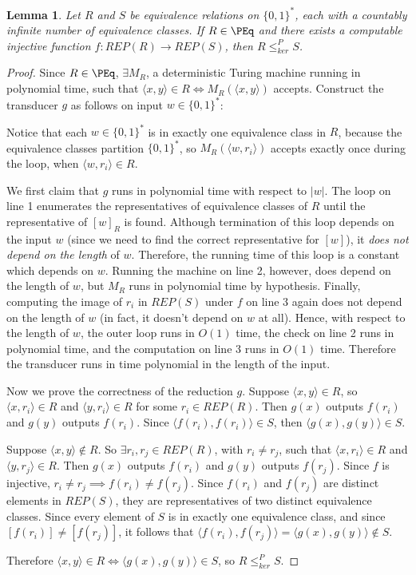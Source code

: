 \documentclass{article}
\newtheorem{lemma}[lemma]{Lemma}
\theoremstyle{definition} \newtheorem{definition}[definition]{Definition}
\newcommand{\sigmastar}{\{0, 1\}^{*}} %
\newcommand{\kr}{\leq^{P}_{ker}} %
\newcommand{\pair}[2]{\langle#1,#2\rangle} %
\begin{document}
\begin{lemma}\label{lem:repr_kr}
  Let $R$ and $S$ be equivalence relations on $\sigmastar$, each with a countably infinite number of equivalence classes.
  If $R\in\PEq$ and there exists a computable injective function $f\colon REP(R)\to REP(S)$, then $R\kr S$.
\end{lemma}
\begin{proof}
  Since $R\in\PEq$, $\exists M_R$, a deterministic Turing machine running in polynomial time, such that $\pair{x}{y}\in R\iff M_R(\pair{x}{y})$ accepts.
  Construct the transducer $g$ as follows on input $w\in\sigmastar$:\\
  \begin{algorithm}[H]
    \For{$r_i\in REP(R)$}{
      \If{$M_R(\pair{w}{r_i})$ accepts}{
        \Return{$f(r_i)$}
      }
    }
  \end{algorithm}
  Notice that each $w\in\sigmastar$ is in exactly one equivalence class in $R$, because the equivalence classes partition $\sigmastar$, so $M_R(\pair{w}{r_i})$ accepts exactly once during the loop, when $\pair{w}{r_i}\in R$.

  We first claim that $g$ runs in polynomial time with respect to $|w|$.
  The loop on line 1 enumerates the representatives of equivalence classes of $R$ until the representative of $[w]_R$ is found.
  Although termination of this loop depends on the input $w$ (since we need to find the correct representative for $[w]$), it \emph{does not depend on the length} of $w$.
  Therefore, the running time of this loop is a constant which depends on $w$.
  Running the machine on line 2, however, does depend on the length of $w$, but $M_R$ runs in polynomial time by hypothesis.
  Finally, computing the image of $r_i$ in $REP(S)$ under $f$ on line 3 again does not depend on the length of $w$ (in fact, it doesn't depend on $w$ at all).
  Hence, with respect to the length of $w$, the outer loop runs in $O(1)$ time, the check on line 2 runs in polynomial time, and the computation on line 3 runs in $O(1)$ time.
  Therefore the transducer runs in time polynomial in the length of the input.

  Now we prove the correctness of the reduction $g$.
  Suppose $\pair{x}{y}\in R$, so $\pair{x}{r_i}\in R$ and $\pair{y}{r_i}\in R$ for some $r_i\in REP(R)$.
  Then $g(x)$ outputs $f(r_i)$ and $g(y)$ outputs $f(r_i)$.
  Since $\pair{f(r_i)}{f(r_i)}\in S$, then $\pair{g(x)}{g(y)}\in S$.

  Suppose $\pair{x}{y}\notin R$.
  So $\exists r_i, r_j\in REP(R)$, with $r_i\neq r_j$, such that $\pair{x}{r_i}\in R$ and $\pair{y}{r_j}\in R$.
  Then $g(x)$ outputs $f(r_i)$ and $g(y)$ outputs $f(r_j)$.
  Since $f$ is injective, $r_i\neq r_j\implies f(r_i)\neq f(r_j)$.
  Since $f(r_i)$ and $f(r_j)$ are distinct elements in $REP(S)$, they are representatives of two distinct equivalence classes.
  Since every element of $S$ is in exactly one equivalence class, and since $[f(r_i)]\neq[f(r_j)]$, it follows that $\pair{f(r_i)}{f(r_j)}=\pair{g(x)}{g(y)}\notin S$.

  Therefore $\pair{x}{y}\in R\iff \pair{g(x)}{g(y)}\in S$, so $R\kr S$.
\end{proof}
\end{document}

